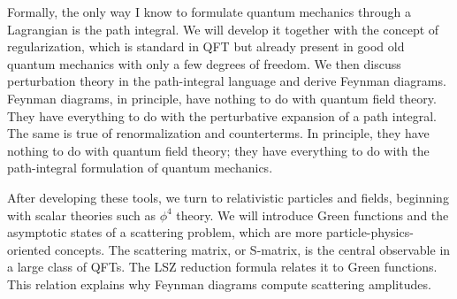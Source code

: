 Formally, the only way I know to formulate quantum mechanics through a
Lagrangian is the path integral. We will develop it together with the concept of
regularization,
which is standard in QFT but already present in good old quantum mechanics with
only a few degrees of freedom. We then discuss
perturbation theory in the path-integral language and derive Feynman diagrams.
Feynman diagrams, in principle, have nothing to do with quantum field theory.
They have everything to do with the perturbative expansion of a path integral.
The same is true of renormalization and counterterms. In principle, they have
nothing to do with quantum field theory; they have everything to do with the
path-integral formulation of quantum mechanics.

After developing these tools, we turn to
relativistic particles and fields, beginning with scalar theories such as
$\phi^4$ theory.
We will introduce Green functions and the asymptotic states of a scattering
problem, which are more particle-physics-oriented concepts.
The scattering matrix, or S-matrix, is the central observable in a large class
of QFTs. The LSZ reduction formula relates it to Green functions.
This relation explains why Feynman diagrams compute scattering amplitudes.

